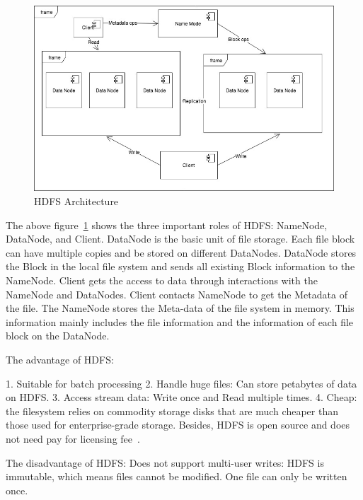 \begin{figure}[!ht]
  \centering\includegraphics[width=\columnwidth]{images/HDFS.jpg}
  \caption{HDFS Architecture}\label{f:hdfs}
\end{figure}


The above figure~\ref{f:hdfs} shows the three important roles of HDFS: NameNode, 
DataNode, and Client. DataNode is the basic unit of file storage. Each file block 
can have multiple copies and be stored on different DataNodes. DataNode stores the 
Block in the local file system and sends all existing Block information to the 
NameNode. Client gets the access to data through interactions with the NameNode and 
DataNodes. Client contacts NameNode to get the Metadata of the file. The NameNode 
stores the Meta-data of the file system in memory. This information mainly includes 
the file information and the information of each file block on the DataNode. 

The advantage of HDFS:

1. Suitable for batch processing
2. Handle huge files: Can store petabytes of data on HDFS.
3. Access stream data: Write once and Read multiple times.
4. Cheap: the filesystem relies on commodity storage disks that are much cheaper 
than those used for enterprise-grade storage. Besides, HDFS is open source and does 
not need pay for licensing fee~\cite{hid-sp18-508-hdfs}.

The disadvantage of HDFS:
 Does not support multi-user writes: HDFS is immutable, which means files cannot 
 be modified. One file can only be written once. 

